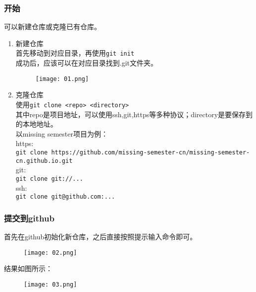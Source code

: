 \documentclass[a4paper, 12pt]{article}
\begin{document}
		\subsubsection{开始}
            可以新建仓库或克隆已有仓库。
            \begin{enumerate}
                \item 新建仓库\\
                    首先移动到对应目录，再使用\verb|git init|\\
                    成功后，应该可以在对应目录找到.git文件夹。                        
                    \begin{figure}[h]
                        \centering
                        \texttt{[image: 01.png]}
                        \label{img01}
                    \end{figure}
                \item 克隆仓库 \\
                    使用\verb|git clone <repo> <directory>|\\
                    其中repo是项目地址，可以使用ssh,git,https等多种协议；directory是要保存到的本地地址。\\
                    以missing semester项目为例：\\
                        https:\\\verb|git clone https://github.com/missing-semester-cn/missing-semester-cn.github.io.git|\\
                        git:\\\verb|git clone git://...|\\
                        ssh:\\\verb|git clone git@github.com:...|
                \end{enumerate}
                
        \subsubsection{提交到github}
            首先在github初始化新仓库，之后直接按照提示输入命令即可。
            \begin{figure}[H]
                \centering
                \texttt{[image: 02.png]}
                \label{img02}
            \end{figure}
            结果如图所示：
            \begin{figure}[H]
                \centering
                \texttt{[image: 03.png]}
                \label{img03}
            \end{figure}
            
\end{document}
